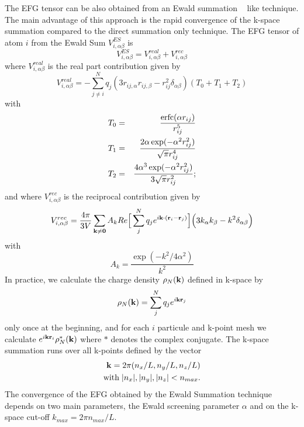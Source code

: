 \documentclass[a4paper]{article}
\def\kk{{\bf k}}
\def\rr{{\bf r}}
\def\00{{\bf 0}}
\begin{document}
The EFG tensor can be also obtained from an Ewald summation
~\cite{ANDP:ANDP19213690304,B-ALLEN_TILDESLEY} like technique.
The main advantage of this approach is the rapid convergence of
the k-space summation compared to the direct summation only technique.
The EFG tensor of atom $i$ from the Ewald Sum $V^{ES}_{i,\alpha\beta}$ is
\begin{equation}
V^{ES}_{i,\alpha\beta} = V^{real}_{i,\alpha\beta} + V^{rec}_{i,\alpha\beta}
\label{eq:EFG_ES}
\end{equation}
where $V^{real}_{i,\alpha\beta}$ is the real part contribution given by
\begin{equation}
V^{real}_{i,\alpha\beta} = - \sum^{N}_{j\ne i} q_j (3 r_{ij,\alpha}r_{ij,\beta} - r_{ij}^2\delta_{\alpha\beta} ) ( T_0 + T_1 + T_2 ) 
\end{equation}
with
\begin{eqnarray}
T_0&=& \frac{{\rm erfc}( \alpha r_{ij} )} {r_{ij}^5} \nonumber \\
T_1&=& \frac{2 \alpha \exp(-\alpha^2 r_{ij}^2)}{\sqrt{\pi}r_{ij}^4}  \nonumber \\
T_2&=& \frac{4 \alpha^3 \exp(-\alpha^2 r_{ij}^2)}{3\sqrt{\pi} r_{ij}^2};
\end{eqnarray}
and where $V^{rec}_{i,\alpha\beta}$ is the reciprocal contribution given by
\begin{equation}
V^{rec}_{i,\alpha\beta} = \frac{4\pi}{3V}\sum_{\kk\ne\00} A_k Re\Big[ \sum^N_j q_j e^{i\kk\cdot(\rr_i-\rr_j)} \Big] \Big( 3 k_\alpha k_\beta - k^2\delta_{\alpha\beta} \Big)
\end{equation}
with
\begin{equation}
A_k = \frac{\exp( - k^2 / 4\alpha^2 )}{k^2} 
\end{equation}
In practice, we calculate the charge density $\rho_N(\kk)$ defined in k-space by
\begin{equation}
\rho_N(\kk) = \sum^N_j q_j e^{i\kk\rr_j}
\end{equation}
only once at the beginning, and for each $i$ particule and k-point mesh
we calculate $e^{i\kk\rr_i} \rho^*_N(\kk)$ where $*$ denotes the complex conjugate.
The k-space summation runs over all k-points defined by the vector
\begin{eqnarray}
\kk=2\pi(n_x/L,n_y/L,n_z/L) \\
{\rm with}\; |n_x|,|n_y|,|n_z| < n_{max}.
\end{eqnarray}
The convergence of the EFG obtained by the Ewald Summation technique
depends on two main parameters, the Ewald screening parameter $\alpha$
and on the k-space cut-off $k_{max}=2\pi n_{max}/L$.
\end{document}
